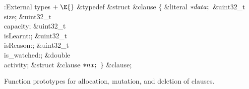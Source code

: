 \Y\B\4:External types\X${}\mathrel+\E{}$\6
\&{typedef} \&{struct} \&{clause} ${}\{{}$\1\6
\&{literal} ${}{*}\\{data};{}$\6
\&{uint32\_t} \\{size};\6
\&{uint32\_t} \\{capacity};\6
\&{uint32\_t} \\{isLearnt}:;\6
\&{uint32\_t} \\{isReason}:;\6
\&{uint32\_t} \\{is\_watched}:;\6
\&{double} \\{activity};\6
\&{struct} \&{clause} ${}{*}\\{nx};{}$\2\6
${}\}{}$ \&{clause};\par
\fi

Function prototypes for allocation, mutation, and deletion of clauses.

